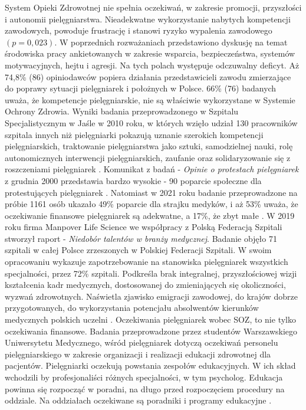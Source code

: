 \documentclass[a4paper,12pt,twoside,openright]{mwrep}
\begin{document}
System Opieki Zdrowotnej nie spełnia oczekiwań, w zakresie promocji, przyszłości i autonomii pielęgniarstwa. Nieadekwatne  wykorzystanie nabytych kompetencji zawodowych, powoduje frustrację i stanowi ryzyko wypalenia zawodowego $(p = 0,023)$. W poprzednich rozważaniach przedstawiono dyskusję  na temat środowiska pracy ankietowanych w zakresie wsparcia, bezpieczeństwa, systemów motywacyjnych, hejtu  i agresji. Na tych polach występuje odczuwalny deficyt. Aż 74,8\%  (86) opiniodawców  popiera działania przedstawicieli zawodu zmierzające do poprawy sytuacji pielęgniarek i położnych w Polsce.  66\% (76) badanych uważa, że kompetencje pielęgniarskie, nie są właściwie wykorzystane w Systemie Ochrony Zdrowia. Wyniki badania przeprowadzonego w Szpitalu Specjalistycznym w Jaśle w 2010 roku, w których wzięło udział 130 pracowników szpitala innych niż pielęgniarki pokazują uznanie szerokich kompetencji pielęgniarskich, traktowanie pielęgniarstwa jako sztuki, samodzielnej nauki, rolę autonomicznych interwencji pielęgniarskich, zaufanie oraz solidaryzowanie się z roszczeniami pielęgniarek \cite{skorupska}. Komunikat z badań -  \textit{Opinie o protestach pielęgniarek} z grudnia 2000 przedstawia bardzo wysokie - 90  poparcie  społeczne dla protestujących pielęgniarek \cite{cebos}. Natomiast w 2021 roku badanie przeprowadzone na próbie 1161 osób ukazało 49\% poparcie dla strajku medyków, i aż 53\% uważa, że oczekiwanie finansowe pielęgniarek są adekwatne, a 17\%, że zbyt małe \cite{cebos2}. W 2019 roku firma Manpover Life Science we współpracy z Polską Federacją Szpitali stworzył raport - \textit{Niedobór talentów w branży medycznej}. Badanie objęło 71 szpitali w całej Polsce zrzeszonych w Polskiej Federacji Szpitali. W swoim opracowaniu wykazuje zapotrzebowanie na stanowiska pielęgniarek wszystkich specjalności, przez 72\% szpitali. Podkreśla brak integralnej, przyszłościowej wizji kształcenia kadr medycznych, dostosowanej do zmieniających się okoliczności, wyzwań zdrowotnych. Naświetla zjawisko emigracji zawodowej,  do krajów dobrze przygotowanych, do wykorzystania potencjału absolwentów kierunków medycznych polskich uczelni \cite{federacja}.
Oczekiwania pielęgniarek wobec SOZ, to nie tylko oczekiwania finansowe. Badania przeprowadzone przez studentów Warszawskiego Uniwersytetu Medycznego, wśród pielęgniarek dotyczą oczekiwań personelu pielęgniarskiego w zakresie organizacji i realizacji edukacji zdrowotnej dla pacjentów.  Pielęgniarki oczekują powstania zespołów edukacyjnych. W ich skład wchodzili by profesjonaliści różnych specjalności, w tym psycholog. Edukacja powinna się rozpocząć w poradni, na długo przed rozpoczęciem procedury na oddziale. Na oddziałach oczekiwane są poradniki i programy edukacyjne \cite{soz}.
\end{document}

